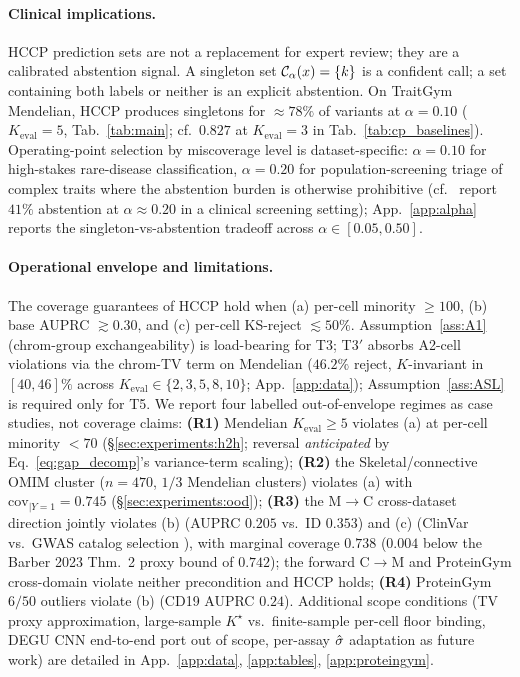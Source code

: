 
\paragraph{Clinical implications.}
HCCP prediction sets are not a replacement for expert review; they are a calibrated abstention signal. A singleton set $\mathcal{C}_\alpha(x) = \{k\}$ is a confident call; a set containing both labels or neither is an explicit abstention. On TraitGym Mendelian, HCCP produces singletons for $\approx 78\%$ of variants at $\alpha = 0.10$ ($K_{\mathrm{eval}} = 5$, Tab.~\ref{tab:main}; cf.\ $0.827$ at $K_{\mathrm{eval}} = 3$ in Tab.~\ref{tab:cp_baselines}). Operating-point selection by miscoverage level is dataset-specific: $\alpha = 0.10$ for high-stakes rare-disease classification, $\alpha = 0.20$ for population-screening triage of complex traits where the abstention burden is otherwise prohibitive (cf.\ \citet{pcos2025conformal} report $41\%$ abstention at $\alpha \approx 0.20$ in a clinical screening setting); App.~\ref{app:alpha} reports the singleton-vs-abstention tradeoff across $\alpha \in [0.05, 0.50]$.

\paragraph{Operational envelope and limitations.}
The coverage guarantees of HCCP hold when (a) per-cell minority $\geq 100$, (b) base AUPRC $\gtrsim 0.30$, and (c) per-cell KS-reject $\lesssim 50\%$. Assumption~\ref{ass:A1} (chrom-group exchangeability) is load-bearing for T3; T3$'$ absorbs A2-cell violations via the chrom-TV term on Mendelian ($46.2\%$ reject, $K$-invariant in $[40, 46]\%$ across $K_{\mathrm{eval}} \in \{2, 3, 5, 8, 10\}$; App.~\ref{app:data}); Assumption~\ref{ass:ASL} is required only for T5. We report four labelled out-of-envelope regimes as case studies, not coverage claims: \textbf{(R1)} Mendelian $K_{\mathrm{eval}} \geq 5$ violates (a) at per-cell minority $< 70$ (§\ref{sec:experiments:h2h}; reversal \emph{anticipated} by Eq.~\eqref{eq:gap_decomp}'s variance-term scaling); \textbf{(R2)} the Skeletal/connective OMIM cluster ($n = 470$, $1/3$ Mendelian clusters) violates (a) with $\mathrm{cov}_{|Y=1} = 0.745$ (§\ref{sec:experiments:ood}); \textbf{(R3)} the M$\to$C cross-dataset direction jointly violates (b) (AUPRC $0.205$ vs.\ ID $0.353$) and (c) (ClinVar vs.\ GWAS catalog selection \citep{tibshirani2019weighted}), with marginal coverage $0.738$ ($0.004$ below the Barber 2023 Thm.~2 proxy bound of $0.742$); the forward C$\to$M and ProteinGym cross-domain violate neither precondition and HCCP holds; \textbf{(R4)} ProteinGym $6/50$ outliers violate (b) (CD19 AUPRC $0.24$). Additional scope conditions (TV proxy approximation, large-sample $K^\star$ vs.\ finite-sample per-cell floor binding, DEGU CNN end-to-end port out of scope, per-assay $\hat{\sigma}$ adaptation as future work) are detailed in App.~\ref{app:data}, \ref{app:tables}, \ref{app:proteingym}.

